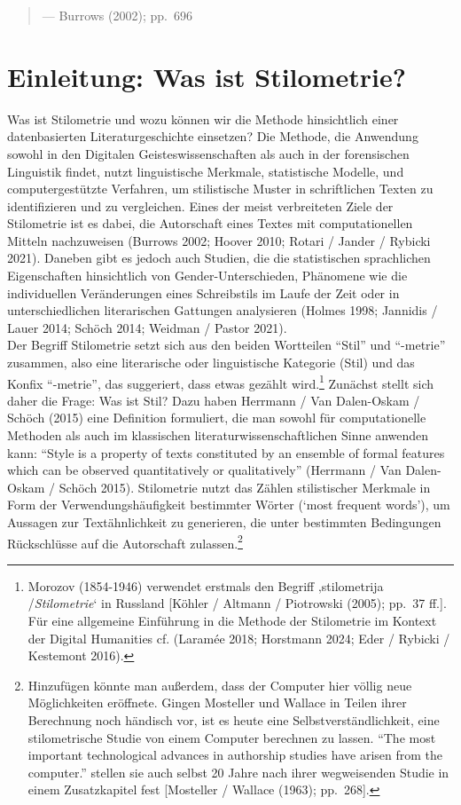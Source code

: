 \documentclass[
  12pt,
  letterpaper,
]{classicthesis}
\begin{document}
\begin{quote}
--- Burrows (2002); pp.~696
\end{quote}

\section{Einleitung: Was ist
Stilometrie?}\label{einleitung-was-ist-stilometrie}

Was ist Stilometrie und wozu können wir die Methode hinsichtlich einer
datenbasierten Literaturgeschichte einsetzen? Die Methode, die Anwendung
sowohl in den Digitalen Geisteswissenschaften als auch in der
forensischen Linguistik findet, nutzt linguistische Merkmale,
statistische Modelle, und computergestützte Verfahren, um stilistische
Muster in schriftlichen Texten zu identifizieren und zu vergleichen.
Eines der meist verbreiteten Ziele der Stilometrie ist es dabei, die
Autorschaft eines Textes mit computationellen Mitteln nachzuweisen
(Burrows 2002; Hoover 2010; Rotari / Jander / Rybicki 2021). Daneben
gibt es jedoch auch Studien, die die statistischen sprachlichen
Eigenschaften hinsichtlich von Gender-Unterschieden, Phänomene wie die
individuellen Veränderungen eines Schreibstils im Laufe der Zeit oder in
unterschiedlichen literarischen Gattungen analysieren (Holmes 1998;
Jannidis / Lauer 2014; Schöch 2014; Weidman / Pastor 2021).\\
Der Begriff Stilometrie setzt sich aus den beiden Wortteilen ``Stil''
und ``-metrie'' zusammen, also eine literarische oder linguistische
Kategorie (Stil) und das Konfix ``-metrie'', das suggeriert, dass etwas
gezählt wird.\footnote{Morozov (1854-1946) verwendet erstmals den
  Begriff ‚stilometrija /\emph{Stilometrie}` in Russland {[}Köhler /
  Altmann / Piotrowski (2005); pp.~37 ff.{]}. Für eine allgemeine
  Einführung in die Methode der Stilometrie im Kontext der Digital
  Humanities cf. (Laramée 2018; Horstmann 2024; Eder / Rybicki /
  Kestemont 2016).} Zunächst stellt sich daher die Frage: Was ist Stil?
Dazu haben Herrmann / Van Dalen-Oskam / Schöch (2015) eine Definition
formuliert, die man sowohl für computationelle Methoden als auch im
klassischen literaturwissenschaftlichen Sinne anwenden kann: ``Style is
a property of texts constituted by an ensemble of formal features which
can be observed quantitatively or qualitatively'' (Herrmann / Van
Dalen-Oskam / Schöch 2015). Stilometrie nutzt das Zählen stilistischer
Merkmale in Form der Verwendungshäufigkeit bestimmter Wörter (`most
frequent words'), um Aussagen zur Textähnlichkeit zu generieren, die
unter bestimmten Bedingungen Rückschlüsse auf die Autorschaft
zulassen.\footnote{Hinzufügen könnte man außerdem, dass der Computer
  hier völlig neue Möglichkeiten eröffnete. Gingen Mosteller und Wallace
  in Teilen ihrer Berechnung noch händisch vor, ist es heute eine
  Selbstverständlichkeit, eine stilometrische Studie von einem Computer
  berechnen zu lassen. ``The most important technological advances in
  authorship studies have arisen from the computer.'' stellen sie auch
  selbst 20 Jahre nach ihrer wegweisenden Studie in einem Zusatzkapitel
  fest {[}Mosteller / Wallace (1963); pp.~268{]}.}
\end{document}
